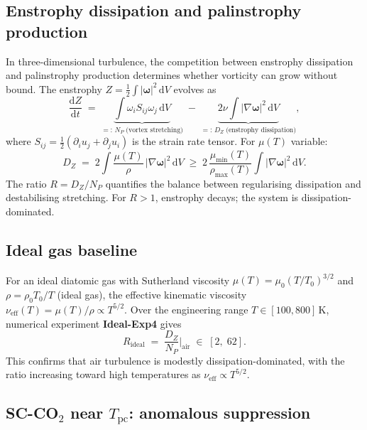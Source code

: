 \documentclass[12pt,a4paper]{article}
\newcommand{\muT}{\mu(T)}           %
\newcommand{\Tc}{T_{\mathrm{pc}}}   %
\newcommand{\DZ}{D_Z}               %
\newcommand{\NP}{N_P}               %
\begin{document}
\subsection{Enstrophy dissipation and palinstrophy production}
\label{sec:stretching:def}

In three-dimensional turbulence, the competition between enstrophy dissipation and
palinstrophy production determines whether vorticity can grow without bound.
The enstrophy $Z = \frac{1}{2}\int |\bm{\omega}|^2\,\mathrm{d}V$ evolves as
\begin{equation}
  \frac{\mathrm{d}Z}{\mathrm{d}t}
  \;=\; \underbrace{\int \omega_i S_{ij} \omega_j\,\mathrm{d}V}_{=:\,N_P \;\text{(vortex stretching)}}
  \;-\; \underbrace{2\nu \int |\nabla\bm{\omega}|^2\,\mathrm{d}V}_{=:\,D_Z \;\text{(enstrophy dissipation)}},
  \label{eq:dZ_dt}
\end{equation}
where $S_{ij} = \frac{1}{2}(\partial_i u_j + \partial_j u_i)$ is the strain rate
tensor.  For $\muT$ variable:
\begin{equation}
  D_Z \;=\; 2\int \frac{\muT}{\rho}\,|\nabla\bm{\omega}|^2\,\mathrm{d}V
  \;\geq\; 2\,\frac{\mu_{\min}(T)}{\rho_{\max}(T)}\int |\nabla\bm{\omega}|^2\,\mathrm{d}V.
\end{equation}
The ratio $R = \DZ/\NP$ quantifies the balance between regularising dissipation
and destabilising stretching.  For $R > 1$, enstrophy decays; the system is
dissipation-dominated.

\subsection{Ideal gas baseline}
\label{sec:stretching:ideal}

For an ideal diatomic gas with Sutherland viscosity $\muT = \mu_0 (T/T_0)^{3/2}$
and $\rho = \rho_0 T_0/T$ (ideal gas), the effective kinematic viscosity
$\nu_{\mathrm{eff}}(T) = \muT/\rho \propto T^{5/2}$.  Over the engineering range
$T \in [100, 800]\,\si{\kelvin}$, numerical experiment \textbf{Ideal-Exp4} gives
\begin{equation}
  R_{\mathrm{ideal}} \;=\; \frac{D_Z}{N_P}\bigg|_{\mathrm{air}} \;\in\; [2,\; 62].
\end{equation}
This confirms that air turbulence is modestly dissipation-dominated, with the
ratio increasing toward high temperatures as $\nu_{\mathrm{eff}} \propto T^{5/2}$.

\subsection{SC-CO$_2$ near $\Tc$: anomalous suppression}
\label{sec:stretching:sco2}
\end{document}
